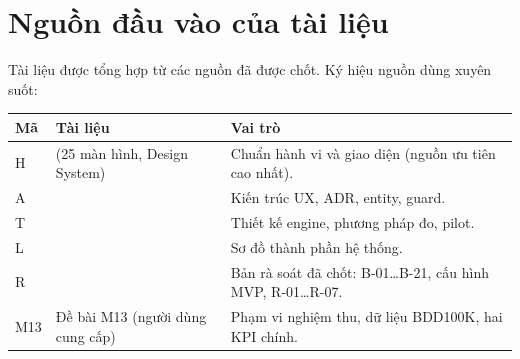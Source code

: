 \section*{Nguồn đầu vào của tài liệu}
Tài liệu được tổng hợp từ các nguồn đã được chốt. Ký hiệu nguồn dùng xuyên suốt:

\begin{xltabular}{\linewidth}{@{}L{1cm}L{6cm}Y@{}}
\toprule
\textbf{Mã} & \textbf{Tài liệu} & \textbf{Vai trò}\\
\midrule
H &  (25 màn hình, Design System) & Chuẩn hành vi và giao diện (nguồn ưu tiên cao nhất).\\
A &  & Kiến trúc UX, ADR, entity, guard.\\
T &  & Thiết kế engine, phương pháp đo, pilot.\\
L &  & Sơ đồ thành phần hệ thống.\\
R &  & Bản rà soát đã chốt: B-01…B-21, cấu hình MVP, R-01…R-07.\\
M13 & Đề bài M13 (người dùng cung cấp) & Phạm vi nghiệm thu, dữ liệu BDD100K, hai KPI chính.\\
\bottomrule
\end{xltabular}

\tableofcontents
\listoffigures
\listoftables
\cleardoublepage

